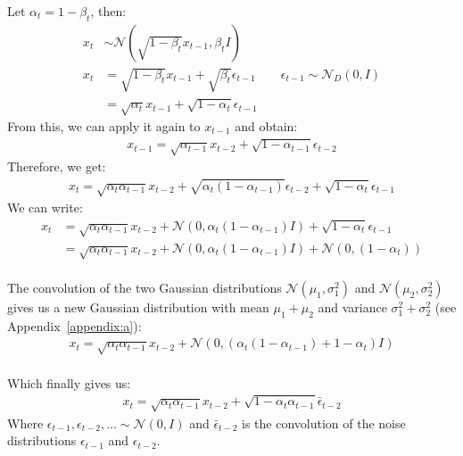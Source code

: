 \documentclass{article}
\numberwithin{equation}{section}
\numberwithin{figure}{section}
\begin{document}
Let $\alpha_t = 1 - \beta_t$, then:
\begin{align*}
  x_t &\sim \mathcal{N}\left(\sqrt{1 - \beta_t} x_{t-1}, \beta_t I\right) \\
  x_t &= \sqrt{1 - \beta_t} x_{t-1} + \sqrt{\beta_t } \epsilon_{t-1} \qquad \epsilon_{t - 1} \sim \mathcal{N}_D \left(0, I\right) \\
  &= \sqrt{\alpha_t} x_{t-1} + \sqrt{1 - \alpha_t} \epsilon_{t - 1}
\end{align*}
From this, we can apply it again to $x_{t-1}$ and obtain:
\begin{align*}
  x_{t-1} = \sqrt{\alpha_{t-1}} x_{t-2} + \sqrt{1 - \alpha_{t-1}} \epsilon_{t - 2}
\end{align*}
Therefore, we get:
\begin{align*}
  x_t = \sqrt{\alpha_t \alpha_{t-1}} x_{t-2} + \sqrt{\alpha_t\left(1 - \alpha_{t-1}\right)} \epsilon_{t - 2} + \sqrt{1 - \alpha_t} \epsilon_{t - 1}
\end{align*}
We can write:
\begin{align}
  x_t &= \sqrt{\alpha_t \alpha_{t-1}} x_{t-2} + \mathcal{N}\left(0, \alpha_t\left(1 - \alpha_{t-1}\right)I \right) + \sqrt{1 - \alpha_t} \epsilon_{t - 1} \\
&= \sqrt{\alpha_t \alpha_{t-1}} x_{t-2} + \mathcal{N}\left(0, \alpha_t\left(1 - \alpha_{t-1}\right)I\right) + \mathcal{N}\left(0, (1 - \alpha_t) \right) \label{eq:convolution}
\end{align}
\\
The convolution of the two Gaussian distributions $\mathcal{N}(\mu_1, \sigma_1^2)$ and $\mathcal{N}(\mu_2, \sigma_2^2)$ gives us a new Gaussian distribution with mean $\mu_1 + \mu_2$ and variance $\sigma_1^2 + \sigma_2^2$ (see Appendix~\ref{appendix:a}):
\begin{align}
  x_t = \sqrt{\alpha_t \alpha_{t-1}} x_{t-2} + \mathcal{N}\left(0, \left(\alpha_t\left(1 - \alpha_{t-1}\right) + 1 - \alpha_t\right)I\right)
\end{align}
\\
Which finally gives us:
\begin{align*}
  x_t = \sqrt{\alpha_t \alpha_{t-1}} x_{t-2} + \sqrt{1 - \alpha_t \alpha_{t-1}} \bar{\epsilon}_{t - 2}
\end{align*}
Where $\epsilon_{t - 1}, \epsilon_{t - 2}, \ldots \sim \mathcal{N}\left(0, I\right)$ and $\bar{\epsilon}_{t - 2}$ is the convolution of the noise distributions $\epsilon_{t - 1}$ and $\epsilon_{t - 2}$.
\end{document}
